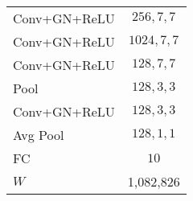 \begin{tabular}{|l|c|}
    Conv+GN+ReLU & $256, 7, 7$\\
    Conv+GN+ReLU & $1024, 7, 7$\\
    Conv+GN+ReLU & $128, 7, 7$\\
    Pool & $128, 3, 3$\\
    Conv+GN+ReLU & $128, 3, 3$\\
    Avg Pool & $128, 1, 1$\\
    FC & $10$\\
    \hline
    \hline
    $W$ & 1,082,826\\
    \hline
\end{tabular}